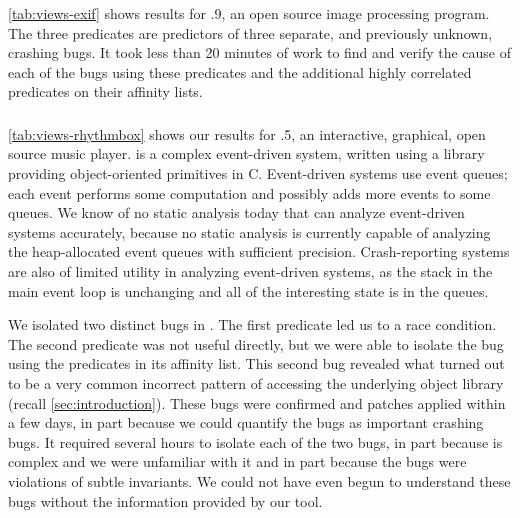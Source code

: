 \subsubsection{\exif}

\autoref{tab:views-exif} shows results for .9, an open source image processing program.
The three predicates are predictors of three separate, and previously unknown, crashing bugs.  It took less
than 20 minutes of work to find and verify the cause of each of the bugs using these predicates
and the additional highly correlated predicates on their affinity lists.

\subsubsection{\rhythmbox}

\autoref{tab:views-rhythmbox} shows our results for .5, an interactive, graphical, open source music player.
\rhythmbox is a complex event-driven system, written using
a library providing object-oriented primitives in C.  Event-driven
systems use event queues; each event performs some computation and
possibly adds more events to some queues.  We know of no static
analysis today that can analyze event-driven systems accurately,
because no static analysis is currently capable of analyzing the
heap-allocated event queues with sufficient precision.
Crash-reporting systems are also of limited utility in analyzing
event-driven systems, as the stack in the main event loop is
unchanging and all of the interesting state is in the queues.

We isolated two distinct bugs in \rhythmbox.  The first predicate led
us to a race condition.  The second predicate was not useful directly,
but we were able to isolate the bug using the predicates in its
affinity list.  This second bug revealed what turned out to be a very
common incorrect pattern of accessing the underlying object library
(recall \autoref{sec:introduction}).  These bugs
were confirmed and patches applied within a few days, in part because
we could quantify the bugs as important crashing bugs.  It required
several hours to isolate each of the two bugs, in part because \rhythmbox
is complex and we were unfamiliar with it and in part because the bugs
were violations of subtle invariants.  We could not have even begun to
understand these bugs without the information provided by our tool.

